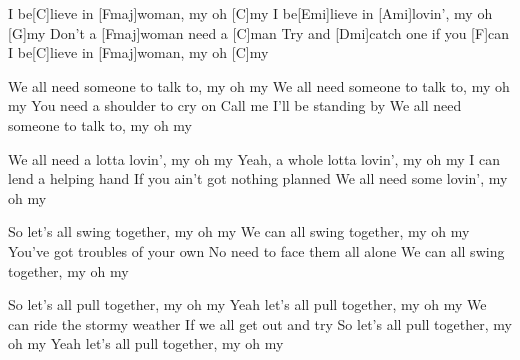 
\sloka
I be[C]lieve in [Fmaj]woman, my oh [C]my
I be[Emi]lieve in [Ami]lovin’, my oh [G]my
Don’t a [Fmaj]woman need a [C]man
Try and [Dmi]catch one if you [F]can
I be[C]lieve in [Fmaj]woman, my oh [C]my

\sloka
We all need someone to talk to, my oh my
We all need someone to talk to, my oh my
You need a shoulder to cry on
Call me I’ll be standing by
We all need someone to talk to, my oh my

\sloka
We all need a lotta lovin’, my oh my
Yeah, a whole lotta lovin’, my oh my
I can lend a helping hand
If you ain’t got nothing planned
We all need some lovin’, my oh my

\sloka
So let’s all swing together, my oh my
We can all swing together, my oh my
You’ve got troubles of your own
No need to face them all alone
We can all swing together, my oh my

\sloka
So let’s all pull together, my oh my
Yeah let’s all pull together, my oh my
We can ride the stormy weather
If we all get out and try
So let’s all pull together, my oh my
Yeah let’s all pull together, my oh my
